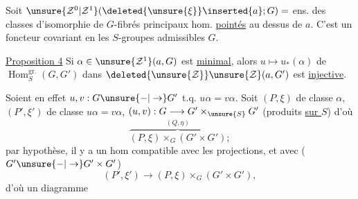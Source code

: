  Soit $\unsure{\mathcal Z^0|\mathcal Z^1}(\deleted{\unsure{\xi}}\inserted{a};G)=$ ens. des classes d'isomorphie de $G$-fibrés principaux hom. \uline{pointés} au dessus de $a$. C'est un foncteur covariant en les $S$-groupes admissibles $G$.

\uline{Proposition 4} Si $\alpha\in\unsure{\mathcal Z^1}(a,G)$ est \uline{minimal}, alors $u\mapsto u_*(\alpha)$ de $\operatorname{Hom}^{\mathrm{gr.}}_S(G,G')$ dans $\deleted{\unsure{\mathcal Z}}\unsure{\mathcal Z}(a,G')$ est \uline{injective}.

Soient en effet $u,v:G\unsure{-|\to}G'$ t.q. $u\alpha=v\alpha$. Soit $(P,\xi)$ de classe $\alpha$, $(P',\xi')$ de classe $u\alpha=v\alpha$, $(u,v):G\longrightarrow G'\times_{\unsure{S}}G'$ (produits \uline{sur $S$}) d'où
\[
\overbrace{(P,\xi)\times_G(G'\times G')}^{(Q,\eta)};
\]
par hypothèse, il y a un hom compatible avec les projections, et avec  ($G'\unsure{-|\to}G'\times G'$)
\[
(P',\xi')\longrightarrow(P,\xi)\times_G(G'\times G'),
\]
d'où un diagramme
